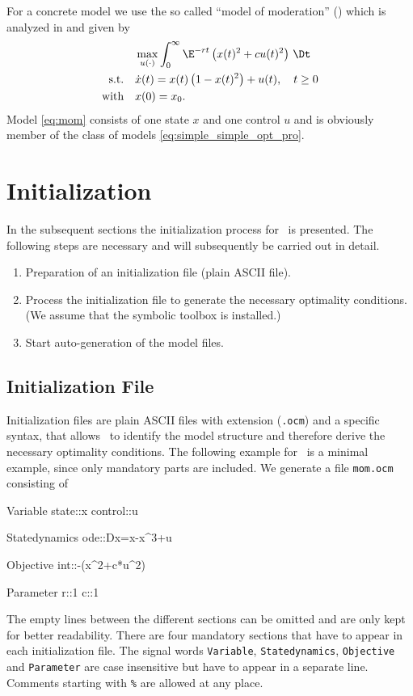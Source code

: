 For a concrete model we use the so called ``model of moderation'' (\MoM) which is analyzed in \citet{caulkinsetal2005a} and given by
\begin{subequations}
\label{eq:mom}
\begin{align}
& \max_{u(\cdot)}\int_0^\infty\E^{-rt}\left(x(t)^2+cu(t)^2\right)\,\Dt\label{eq:mom1}\\
\text{s.t.}\quad & \dot{x}(t)=x(t)\left(1-x(t)^2\right)+u(t),\quad t\ge0\label{mom2}\\
\text{with}\quad & x(0) = x_0.\label{eq:mom3}
\end{align}
\end{subequations}
Model \cref{eq:mom} consists of one state $x$ and one control $u$ and is obviously member of the class of models \cref{eq:simple_simple_opt_pro}. 

\section{Initialization}
\label{sec:InitializationMoM}
In the subsequent sections the initialization process for \MoM\ is presented. The following steps are necessary and will subsequently be carried out in detail.
\begin{enumerate}
	\item Preparation of an initialization file (plain ASCII file).
	\item Process the initialization file to generate the necessary optimality conditions. (We assume that the symbolic toolbox is installed.)
	\item Start auto-generation of the model files.
\end{enumerate}

\subsection{Initialization File}
\label{sec:InitializationFile}
Initialization files are plain ASCII files with extension (\lstinline+.ocm+) and a specific syntax, that allows \OCMAT\ to identify the model structure and therefore derive the necessary optimality conditions. The following example for \MoM\ is a minimal example, since only mandatory parts are included. We generate a file \lstinline+mom.ocm+ consisting of
\begin{ocmlisting}
Variable
state::x
control::u

Statedynamics
ode::Dx=x-x^3+u

Objective
int::-(x^2+c*u^2)

Parameter
r::1
c::1
\end{ocmlisting}
The empty lines between the different sections can be omitted and are only kept for better readability. There are four mandatory sections that have to appear in each initialization file. The signal words \lstinline+Variable+, \lstinline+Statedynamics+, \lstinline+Objective+ and \lstinline+Parameter+ are case insensitive but have to appear in a separate line. Comments starting with \lstinline+%+ are allowed at any place.

